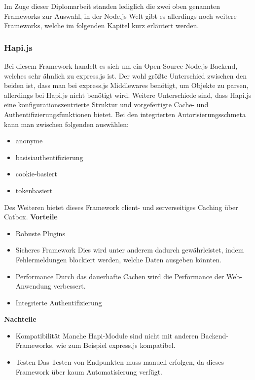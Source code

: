 Im Zuge dieser Diplomarbeit standen lediglich die zwei oben genannten Frameworks zur Auswahl, in der Node.js Welt gibt es allerdings noch weitere Frameworks, welche im folgenden Kapitel kurz erläutert werden.

\subsubsection{Hapi.js}
Bei diesem Framework handelt es sich um ein Open-Source Node.js Backend, welches sehr ähnlich zu express.js ist. Der wohl größte Unterschied zwischen den beiden ist, dass man bei express.js Middlewares benötigt, um Objekte zu parsen, allerdings bei Hapi.js nicht benötigt wird. Weitere Unterschiede sind, dass Hapi.js eine konfigurationszentrierte Struktur und vorgefertigte Cache- und Authentifizierungsfunktionen bietet. Bei den integrierten Autorisierungsschmeta kann man zwischen folgenden auswählen:
\begin{itemize}
    \item anonyme
    \item basisiauthentifizierung
    \item cookie-basiert
    \item tokenbasiert
\end{itemize}
Des Weiteren bietet dieses Framework client- und serverseitiges Caching über Catbox.
\newline
\textbf{Vorteile}
\begin{itemize}
    \item Robuste Plugins
    \item Sicheres Framework
        \newline
        Dies wird unter anderem dadurch gewährleistet, indem Fehlermeldungen blockiert werden, welche Daten ausgeben könnten.
    \item Performance
        \newline
        Durch das dauerhafte Cachen wird die Performance der Web-Anwendung verbessert.
    \item Integrierte Authentifizierung
\end{itemize}

\textbf{Nachteile}
\begin{itemize}
    \item Kompatibilität
        \newline
        Manche Hapi-Module sind nicht mit anderen Backend-Frameworks, wie zum Beispiel express.js kompatibel.
    \item Testen
        \newline
        Das Testen von Endpunkten muss manuell erfolgen, da dieses Framework über kaum Automatisierung verfügt.
\end{itemize}
\cite{backend_hapi}

